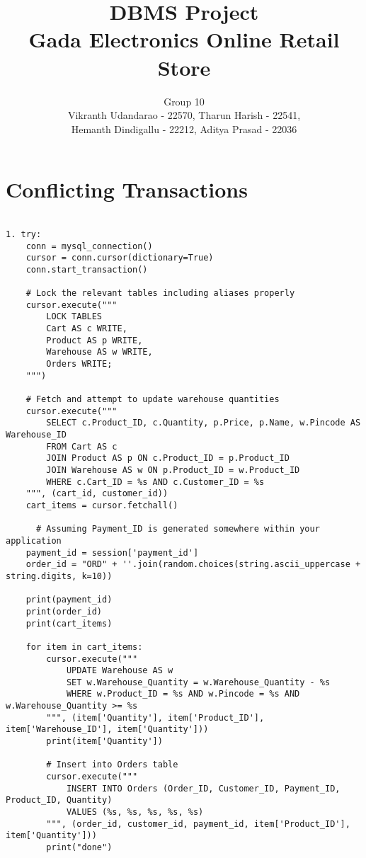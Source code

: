 \documentclass[12pt]{article}
\begin{document}
\title{\textbf{DBMS Project\\ Gada Electronics Online Retail Store}}
\author{Group 10 \\ Vikranth Udandarao - 22570, Tharun Harish - 22541, \\ Hemanth Dindigallu - 22212, Aditya Prasad - 22036}
\date{}
\maketitle

\section*{Conflicting Transactions}

\begin{verbatim}

1. try:
    conn = mysql_connection()
    cursor = conn.cursor(dictionary=True)
    conn.start_transaction()
    
    # Lock the relevant tables including aliases properly
    cursor.execute("""
        LOCK TABLES 
        Cart AS c WRITE, 
        Product AS p WRITE, 
        Warehouse AS w WRITE, 
        Orders WRITE;
    """)
    
    # Fetch and attempt to update warehouse quantities
    cursor.execute("""
        SELECT c.Product_ID, c.Quantity, p.Price, p.Name, w.Pincode AS Warehouse_ID
        FROM Cart AS c
        JOIN Product AS p ON c.Product_ID = p.Product_ID
        JOIN Warehouse AS w ON p.Product_ID = w.Product_ID
        WHERE c.Cart_ID = %s AND c.Customer_ID = %s
    """, (cart_id, customer_id))
    cart_items = cursor.fetchall()
    
      # Assuming Payment_ID is generated somewhere within your application
    payment_id = session['payment_id']
    order_id = "ORD" + ''.join(random.choices(string.ascii_uppercase + string.digits, k=10))
    
    print(payment_id)
    print(order_id)
    print(cart_items)
    
    for item in cart_items:
        cursor.execute("""
            UPDATE Warehouse AS w
            SET w.Warehouse_Quantity = w.Warehouse_Quantity - %s
            WHERE w.Product_ID = %s AND w.Pincode = %s AND w.Warehouse_Quantity >= %s
        """, (item['Quantity'], item['Product_ID'], item['Warehouse_ID'], item['Quantity']))
        print(item['Quantity'])
      
        # Insert into Orders table
        cursor.execute("""
            INSERT INTO Orders (Order_ID, Customer_ID, Payment_ID, Product_ID, Quantity)
            VALUES (%s, %s, %s, %s, %s)
        """, (order_id, customer_id, payment_id, item['Product_ID'], item['Quantity']))
        print("done")
        

\end{verbatim}
\end{document}
